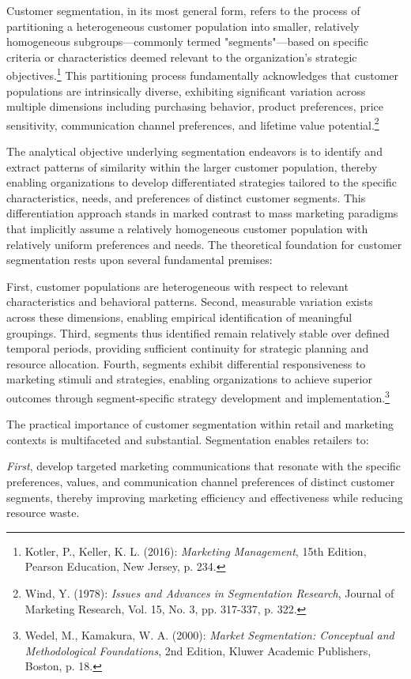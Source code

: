 \documentclass[12pt,a4paper,oneside]{report}
\begin{document}
Customer segmentation, in its most general form, refers to the process of partitioning a heterogeneous customer population into smaller, relatively homogeneous subgroups—commonly termed "segments"—based on specific criteria or characteristics deemed relevant to the organization's strategic objectives.\footnote{Kotler, P., Keller, K. L. (2016): \textit{Marketing Management}, 15th Edition, Pearson Education, New Jersey, p. 234.} This partitioning process fundamentally acknowledges that customer populations are intrinsically diverse, exhibiting significant variation across multiple dimensions including purchasing behavior, product preferences, price sensitivity, communication channel preferences, and lifetime value potential.\footnote{Wind, Y. (1978): \textit{Issues and Advances in Segmentation Research}, Journal of Marketing Research, Vol. 15, No. 3, pp. 317-337, p. 322.}

The analytical objective underlying segmentation endeavors is to identify and extract patterns of similarity within the larger customer population, thereby enabling organizations to develop differentiated strategies tailored to the specific characteristics, needs, and preferences of distinct customer segments. This differentiation approach stands in marked contrast to mass marketing paradigms that implicitly assume a relatively homogeneous customer population with relatively uniform preferences and needs. The theoretical foundation for customer segmentation rests upon several fundamental premises:

First, customer populations are heterogeneous with respect to relevant characteristics and behavioral patterns. Second, measurable variation exists across these dimensions, enabling empirical identification of meaningful groupings. Third, segments thus identified remain relatively stable over defined temporal periods, providing sufficient continuity for strategic planning and resource allocation. Fourth, segments exhibit differential responsiveness to marketing stimuli and strategies, enabling organizations to achieve superior outcomes through segment-specific strategy development and implementation.\footnote{Wedel, M., Kamakura, W. A. (2000): \textit{Market Segmentation: Conceptual and Methodological Foundations}, 2nd Edition, Kluwer Academic Publishers, Boston, p. 18.}

The practical importance of customer segmentation within retail and marketing contexts is multifaceted and substantial. Segmentation enables retailers to:

\textit{First}, develop targeted marketing communications that resonate with the specific preferences, values, and communication channel preferences of distinct customer segments, thereby improving marketing efficiency and effectiveness while reducing resource waste.
\end{document}
